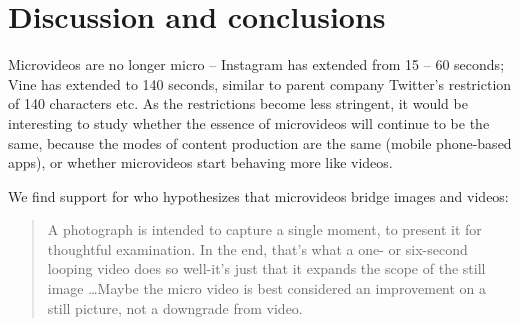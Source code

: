 \section{Discussion and conclusions}
Microvideos are no longer micro -- Instagram has extended from 15 -- 60 seconds; Vine has extended to 140 seconds, similar to parent company Twitter's restriction of 140 characters etc. As the restrictions become less stringent, it would be interesting to study whether the essence of microvideos will continue to be the same, because the modes of content production are the same (mobile phone-based apps), or whether microvideos start behaving more like videos.

We find support for \cite{pogue13}  who hypothesizes that microvideos bridge images and videos:
\begin{quotation}
	A photograph is intended to capture a single moment, to present it for thoughtful examination. In the end, that's what a one- or six-second looping video does so well-it's just that it expands the scope of the still image \ldots Maybe the micro video is best considered an improvement on a still picture, not a downgrade from video.
\end{quotation}